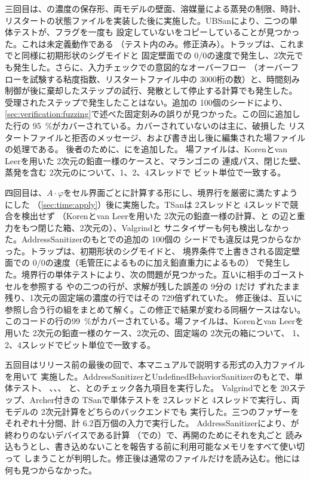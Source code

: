 三回目は、の濃度の保存形、両モデルの壁面、溶媒量による蒸発の制限、時計、
リスタートの状態ファイルを実装した後に実施した。UBSanにより、二つの単体テストが、フラグを一度も
設定していないをコピーしていることが見つかった。これは未定義動作である
（テスト内のみ。修正済み）。トラップは、これまでと同様に初期形状のシグモイドと
固定壁面での 0/0の速度で発生し、2次元でも発生した。さらに、入力チェックでの意図的なオーバーフロー
（オーバーフローを試験する粘度指数、リスタートファイル中の 3000桁の数）と、時間刻み
制御が後に棄却したステップの試行、発散として停止する計算でも発生した。
受理されたステップで発生したことはない。追加の 100個のシードにより、
\cref{sec:verification:fuzzing}で述べた固定刻みの誤りが見つかった。この回に追加した行の
\SI{95}{\percent}がカバーされている。カバーされていないのは主に、破損した
リスタートファイルと拒否のメッセージ、および書き出し後に編集された場ファイルの処理である。
後者のために、にを追加した。
場ファイルは、Korenとvan Leerを用いた 2次元の鉛直一様のケースと、マランゴニの
連成パス、閉じた壁、蒸発を含む 2次元のについて、1、2、4スレッドで
ビット単位で一致する。

四回目は、$A\cdot\varphi$をセル界面ごとに計算する形にし、境界行を厳密に満たすようにした
（\cref{sec:time:apply}）後に実施した。TSanは 2スレッドと 4スレッドで競合を検出せず
（Korenとvan Leerを用いた 2次元の鉛直一様の計算、と
の辺と重力をもつ閉じた箱、2次元の）、Valgrindと
サニタイザーも何も検出しなかった。AddressSanitizerのもとでの追加の 100個の
シードでも違反は見つからなかった。トラップは、初期形状のシグモイドと、
境界条件で上書きされる固定壁面での 0/0の速度（毛管圧によるものに加え鉛直重力によるもの）
で発生した。境界行の単体テストにより、次の問題が見つかった。互いに相手のゴーストセルを参照する
やの二つの行が、求解が残した誤差の 9分の 1だけ
ずれたまま残り、1次元の固定端の濃度の行ではその 729倍ずれていた。
修正後は、互いに参照し合う行の組をまとめて解く。この修正で結果が変わる同梱ケースはない。
このコードの行の\SI{99}{\percent}がカバーされている。場ファイルは、Korenとvan Leerを
用いた 2次元の鉛直一様のケース、2次元の、固定端の 2次元の箱について、
1、2、4スレッドでビット単位で一致する。

五回目はリリース前の最後の回で、本マニュアルで説明する形式の入力ファイルを用いて
実施した。AddressSanitizerとUndefinedBehaviorSanitizerのもとで、単体テスト、
、、、
と、とのチェック各九項目を実行した。
Valgrindでとを 20ステップ、Archer付きの
TSanで単体テストを 2スレッドと 4スレッドで実行し、両モデルの 2次元計算をどちらのバックエンドでも
実行した。三つのファザーをそれぞれ十分間、計 6.2百万個の入力で実行した。
AddressSanitizerにより、が終わりのないデバイスである計算
（での）で、再開のためにそれを丸ごと
読み込もうとし、書き込めないことを報告する前に利用可能なメモリをすべて使い切って
しまうことが判明した。修正後は通常のファイルだけを読み込む。他には何も見つからなかった。

